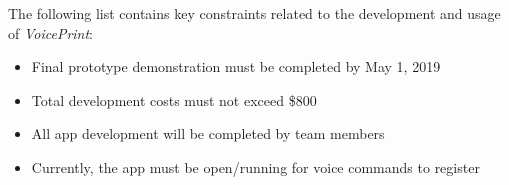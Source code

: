 The following list contains key constraints related to the development and usage of \textit{VoicePrint}:

\begin{itemize}
  \item Final prototype demonstration must be completed by May 1, 2019
  \item Total development costs must not exceed \$800
  \item All app development will be completed by team members
  \item Currently, the app must be open/running for voice commands to register
\end{itemize}
